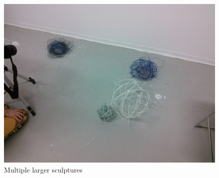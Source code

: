 \begin{figure}[h!]
\centering
\includegraphics[width=\hsize]{art/IMG_20160205_113249.jpg}
\caption{\label{fig:art_3} Multiple larger sculptures }
\end{figure}